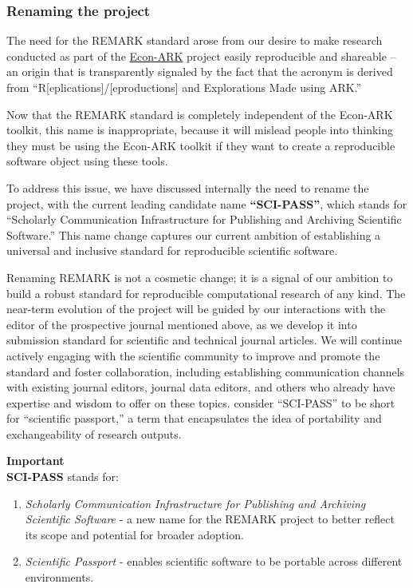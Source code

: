 \documentclass{article}
\begin{document}

\subsubsection{Renaming the project}

The need for the REMARK standard arose from our desire to make research conducted as part of the \href{https://econ-ark.org}{Econ-ARK} project easily reproducible and shareable -- an origin that is transparently signaled by the fact that the acronym is derived from ``R[eplications]/[eproductions] and Explorations Made using ARK.''

Now that the REMARK standard is completely independent of the Econ-ARK toolkit, this name is inappropriate, because it will mislead people into thinking they must be using the Econ-ARK toolkit if they want to create a reproducible software object using these tools.

To address this issue, we have discussed internally the need to rename the project, with the current leading candidate name \textbf{``SCI-PASS''}, which stands for ``Scholarly Communication Infrastructure for Publishing and Archiving Scientific Software.'' This name change captures our current ambition of establishing a universal and inclusive standard for reproducible scientific software.

Renaming REMARK is not a cosmetic change; it is a signal of our ambition to build a robust standard for reproducible computational research of any kind. The near-term evolution of the project will be guided by our interactions with the editor of the prospective journal mentioned above, as we develop it into submission standard for scientific and technical journal articles. We will continue actively engaging with the scientific community to improve and promote the standard and foster collaboration, including establishing communication channels with existing journal editors, journal data editors, and others who already have expertise and wisdom to offer on these topics. consider ``SCI-PASS'' to be short for ``scientific passport,'' a term that encapsulates the idea of portability and exchangeability of research outputs.

\begin{framed}
\textbf{Important}\\
\textbf{SCI-PASS} stands for:

\begin{enumerate}
\item \textit{Scholarly Communication Infrastructure for Publishing and Archiving Scientific Software} - a new name for the REMARK project to better reflect its scope and potential for broader adoption.
\item \textit{Scientific Passport} - enables scientific software to be portable across different environments.
\end{enumerate}
\end{framed}
\end{document}
